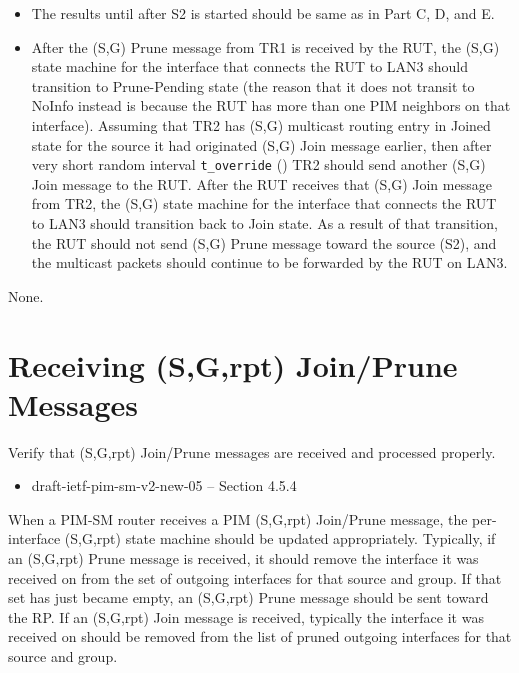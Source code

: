 \documentclass[11pt]{report}
\begin{document}

\begin{itemize}

  \item The results until after S2 is started should be same as in
  Part C, D, and E.

  \item After the (S,G) Prune message from TR1 is received by the RUT,
  the (S,G) state machine for the interface that connects the RUT to
  LAN3 should transition to Prune-Pending state (the reason that it does
  not transit to NoInfo instead is because the RUT has more than one PIM
  neighbors on that interface).
  Assuming that TR2 has (S,G) multicast routing entry in Joined state
  for the source it had originated (S,G) Join message earlier, then after
  very short random interval \verb=t_override= ({\PimsmTOverride}) TR2
  should send another (S,G) Join message to the RUT.
  After the RUT receives that (S,G) Join message from TR2,
  the (S,G) state machine for the interface that connects the RUT to
  LAN3 should transition back to Join state.
  As a result of that transition, the RUT should not send (S,G) Prune
  message toward the source (S2), and the multicast packets should continue
  to be forwarded by the RUT on LAN3.

\end{itemize}

None.

\newpage
\section{Receiving (S,G,rpt) Join/Prune Messages}

Verify that (S,G,rpt) Join/Prune messages are received and processed
properly.

\begin{itemize}
  \item draft-ietf-pim-sm-v2-new-05 -- Section 4.5.4
\end{itemize}

When a PIM-SM router receives a PIM (S,G,rpt) Join/Prune message, the
per-interface (S,G,rpt) state machine should be updated appropriately.
Typically, if an (S,G,rpt) Prune message is received, it should
remove the interface it was received on from the set of outgoing interfaces
for that source and group. If that set has just became empty, an (S,G,rpt)
Prune message should be sent toward the RP.
If an (S,G,rpt) Join message is received, typically the interface it was
received on should be removed from the list of pruned outgoing interfaces for
that source and group.
\end{document}
